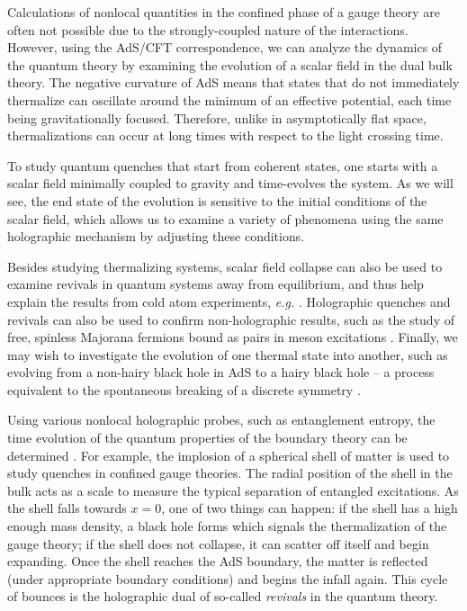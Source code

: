 \documentclass[../PhD.tex]{subfiles}
\begin{document}
Calculations of nonlocal quantities in the confined phase of a gauge theory are often not possible due to the strongly-coupled nature of the interactions. However, using the AdS/CFT correspondence, we can analyze the dynamics of the quantum theory by examining the evolution of a scalar field in the dual bulk theory. The negative curvature of AdS means that states that do not immediately thermalize can oscillate around the minimum of an effective potential, each time being gravitationally focused. Therefore, unlike in asymptotically flat space, thermalizations can occur at long times with respect to the light crossing time. 

To study quantum quenches that start from coherent states, one starts with a scalar field minimally coupled to gravity and time-evolves the system. As we will see, the end state of the evolution is sensitive to the initial conditions of the scalar field, which allows us to examine a variety of phenomena using the same holographic mechanism by adjusting these conditions.

Besides studying thermalizing systems, scalar field collapse can also be used to examine revivals in quantum systems away from equilibrium, and thus help explain the results from cold atom experiments, {\it e.g.} \cite{Dziarmaga2010, 2011arXiv1106.3567L}. Holographic quenches and revivals can also be used to confirm non-holographic results, such as the study of free, spinless Majorana fermions bound as pairs in meson excitations \cite{1706.02438}. Finally, we may wish to investigate the evolution of one thermal state into another, such as evolving from a non-hairy black hole in AdS to a hairy black hole -- a process equivalent to the spontaneous breaking of a discrete symmetry \cite{1704.05454}.

Using various nonlocal holographic probes, such as entanglement entropy, the time evolution of the quantum properties of the boundary theory can be determined \cite{1410.6201, 1412.6002}. For example, the implosion of a spherical shell of matter is used to study quenches in confined gauge theories. The radial position of the shell in the bulk acts as a scale to measure the typical separation of entangled excitations. As the shell falls towards $x = 0$, one of two things can happen: if the shell has a high enough mass density, a black hole forms which signals the thermalization of the gauge theory; if the shell does not collapse, it can scatter off itself and begin expanding. Once the shell reaches the AdS boundary, the matter is reflected (under appropriate boundary conditions) and begins the infall again. This cycle of bounces is the holographic dual of so-called \emph{revivals} in the quantum theory.
\end{document}
